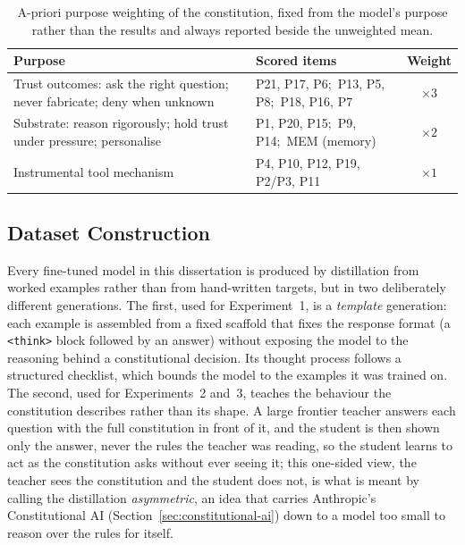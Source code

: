 \begin{table}[H]
  \centering
  \caption{A-priori purpose weighting of the constitution, fixed from the model's purpose rather than the results and always reported beside the unweighted mean.}
  \label{tab:tiers}
  \begin{tabular}{p{5cm}p{6.4cm}c}
    \hline
    Purpose & Scored items & Weight \\
    \hline
    Trust outcomes: ask the right question; never fabricate; deny when unknown
      & P21, P17, P6;\ P13, P5, P8;\ P18, P16, P7 & $\times 3$ \\
    Substrate: reason rigorously; hold trust under pressure; personalise
      & P1, P20, P15;\ P9, P14;\ MEM (memory) & $\times 2$ \\
    Instrumental tool mechanism
      & P4, P10, P12, P19, P2/P3, P11 & $\times 1$ \\
    \hline
  \end{tabular}
\end{table}

\subsection{Dataset Construction}
\label{subsec:mr-dataset}

Every fine-tuned model in this dissertation is produced by distillation from worked examples rather than from hand-written targets, but in two deliberately different generations. The first, used for Experiment~1, is a \emph{template} generation: each example is assembled from a fixed scaffold that fixes the response format (a \texttt{<think>} block followed by an answer) without exposing the model to the reasoning behind a constitutional decision. Its thought process follows a structured checklist, which bounds the model to the examples it was trained on. The second, used for Experiments~2 and~3, teaches the behaviour the constitution describes rather than its shape. A large frontier teacher answers each question with the full constitution in front of it, and the student is then shown only the answer, never the rules the teacher was reading, so the student learns to act as the constitution asks without ever seeing it; this one-sided view, the teacher sees the constitution and the student does not, is what is meant by calling the distillation \emph{asymmetric}, an idea that carries Anthropic's Constitutional AI (Section~\ref{sec:constitutional-ai}) down to a model too small to reason over the rules for itself.

